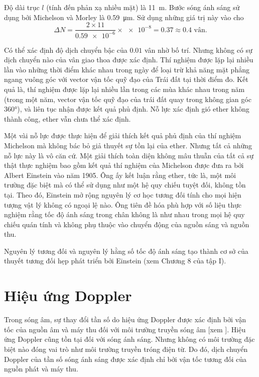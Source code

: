 Độ dài trục $l$ (tính đến phản xạ nhiều mặt) là \SI{11}{m}.
Bước sóng ánh sáng sử dụng bởi Michelson và Morley là \SI{0.59}{\micro\metre}.
Sử dụng những giá trị này vào  cho
\begin{equation*}
	\Delta{N} = \frac{2\times 11}{\num{0.59e-6}} \times \num{e-8} = 0.37 \approx 0.4\text{ vân}.
\end{equation*}

\noindent
Có thể xác định độ dịch chuyển bậc của $0.01$ vân nhờ bố trí.
Nhưng không có sự dịch chuyển nào của vân giao thoa được xác định.
Thí nghiệm được lặp lại nhiều lần vào những thời điểm khác nhau trong ngày để loại trừ khả năng mặt phẳng ngang vuông góc với vector vận tốc quỹ đạo của Trái đất tại thời điểm đo.
Kết quả là, thí nghiệm được lặp lại nhiều lần trong các mùa khác nhau trong năm (trong một năm, vector vận tốc quỹ đạo của trái đất quay trong không gian góc \ang{360}), và liên tục nhận được kết quả phủ định.
Nỗ lực xác định gió ether không thành công, ether vẫn chưa thể xác định.

Một vài nỗ lực được thực hiện để giải thích kết quả phủ định của thí nghiệm Michelson mà không bác bỏ giả thuyết sự tồn lại của ether.
Nhưng tất cả những nỗ lực này là vô căn cứ.
Một giải thích toàn diện không mâu thuẫn của tất cả sự thật thực nghiệm bao gồm kết quả thí nghiệm của Michelson được đưa ra bởi Albert Einstein vào năm 1905.
Ông ấy kết luận rằng ether, tức là, một môi trường đặc biệt mà có thể sử dụng như một hệ quy chiếu tuyệt đối, không tồn tại.
Theo đó, Einstein mở rộng nguyên lý cơ học tương đối tính cho mọi hiện tượng vật lý không có ngoại lệ nào.
Ông tiên đề hóa phù hợp với số liệu thực nghiệm rằng tốc độ ánh sáng trong chân không là như nhau trong mọi hệ quy chiếu quán tính và không phụ thuộc vào chuyển động của nguồn sáng và nguồn thu.

Nguyên lý tương đối và nguyên lý hằng số tốc độ ánh sáng tạo thành cơ sở của thuyết tương đối hẹp phát triển bởi Einstein (xem Chương 8 của tập I).

\section{Hiệu ứng Doppler}\label{sec:21_4}

Trong sóng âm, sự thay đổi tần số do hiệu ứng Doppler được xác định bởi vận tốc của nguồn âm và máy thu đối với môi trường truyền sóng âm [xem ].
Hiệu ứng Doppler cũng tồn tại đối với sóng ánh sáng.
Nhưng không có môi trường đặc biệt nào đóng vai trò như môi trường truyền tróng điện từ.
Do đó, dịch chuyển Doppler của tần số sóng ánh sáng được xác định chỉ bởi vận tốc tương đối của nguồn phát và máy thu.


